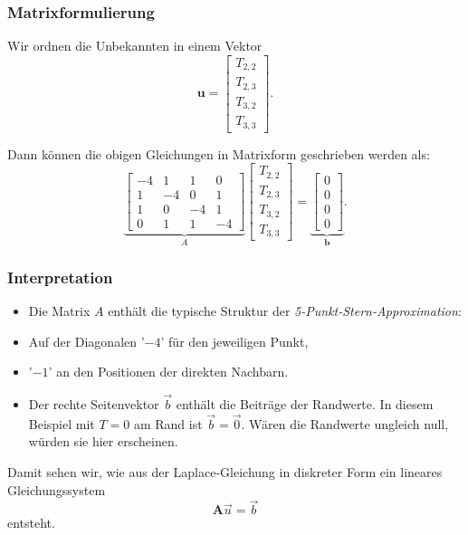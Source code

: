 \subsubsection*{Matrixformulierung}

Wir ordnen die Unbekannten in einem Vektor
\[
\mathbf{u} =
\begin{bmatrix}
	T_{2,2} \\ T_{2,3} \\ T_{3,2} \\ T_{3,3}
\end{bmatrix}.
\]

Dann können die obigen Gleichungen in Matrixform geschrieben werden als:
\[
\underbrace{\begin{bmatrix}
		-4 &  1 &  1 &  0 \\
		1 & -4 &  0 &  1 \\
		1 &  0 & -4 &  1 \\
		0 &  1 &  1 & -4
\end{bmatrix}}_{A}
\begin{bmatrix}
	T_{2,2} \\ T_{2,3} \\ T_{3,2} \\ T_{3,3}
\end{bmatrix}
=
\underbrace{\begin{bmatrix}
		0 \\ 0 \\ 0 \\ 0
\end{bmatrix}}_{\mathbf{b}}.
\]

\subsubsection*{Interpretation}
\begin{itemize}
	\item Die Matrix $A$ enthält die typische Struktur der \emph{5-Punkt-Stern-Approximation}: 
	\item Auf der Diagonalen '$-4$' für den jeweiligen Punkt,
	\item '$-1$' an den Positionen der direkten Nachbarn.  
	\item Der rechte Seitenvektor $\vec{b}$ enthält die Beiträge der Randwerte.  
	In diesem Beispiel mit $T=0$ am Rand ist $\vec{b}=\vec{0}$.  
	Wären die Randwerte ungleich null, würden sie hier erscheinen. 
\end{itemize}
Damit sehen wir, wie aus der Laplace-Gleichung in diskreter Form ein lineares Gleichungssystem
\[
\mathbf{A} \vec{u}
=
\vec{b}
\]
entsteht.

